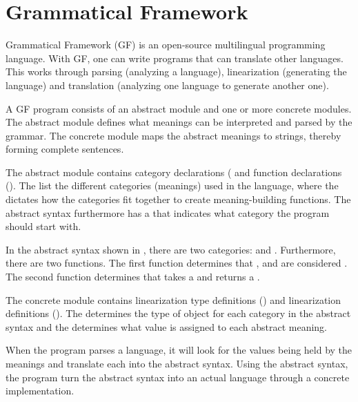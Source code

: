\section{Grammatical Framework}
\label{GF}

Grammatical Framework (GF) is an open-source multilingual programming language. With GF, one can write programs that can translate other languages. This works through parsing (analyzing a language), linearization (generating the language) and translation (analyzing one language to generate another one).

A GF program consists of an abstract module and one or more concrete modules. The abstract module defines what meanings can be interpreted and parsed by the grammar. The concrete module maps the abstract meanings to strings, thereby forming complete sentences.

The abstract module contains category declarations ( and function declarations (). The  list the different categories (meanings) used in the language, where the  dictates how the categories fit together to create meaning-building functions. The abstract syntax furthermore has a  that indicates what category the program should start with. 


In the abstract syntax shown in , there are two categories:  and . Furthermore, there are two functions. The first function determines that ,  and  are considered . The second function determines that  takes a  and returns a .

The concrete module contains linearization type definitions () and linearization definitions
(). The  determines the type of object for each category in the abstract syntax and the  determines what value is assigned to each abstract meaning. 

When the program parses a language, it will look for the values being held by the meanings and translate each into the abstract syntax. Using the abstract syntax, the program turn the abstract syntax into an actual language through a concrete implementation.


